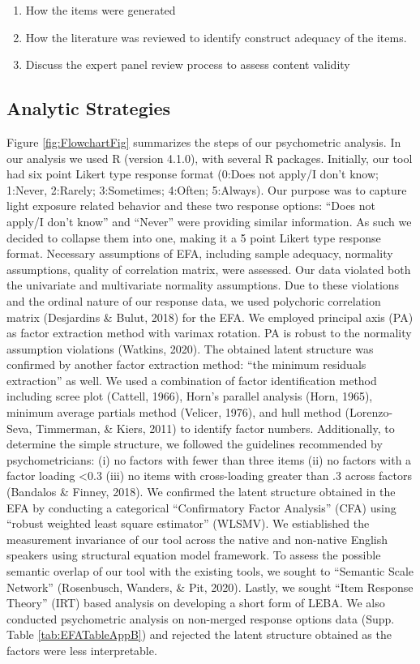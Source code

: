 \documentclass[
  english,
  man]{apa6}
\providecommand{\tightlist}{%
  \setlength{\itemsep}{0pt}\setlength{\parskip}{0pt}}
\begin{document}
\begin{enumerate}
\def\labelenumi{\arabic{enumi}.}
\tightlist
\item
  How the items were generated
\item
  How the literature was reviewed to identify construct adequacy of the items.
\item
  Discuss the expert panel review process to assess content validity
\end{enumerate}

\hypertarget{analytic-strategies}{%
\subsection{Analytic Strategies}\label{analytic-strategies}}

Figure \ref{fig:FlowchartFig} summarizes the steps of our psychometric analysis. In our analysis we used R (version 4.1.0), with several R packages. Initially, our tool had six point Likert type response format (0:Does not apply/I don't know; 1:Never, 2:Rarely; 3:Sometimes; 4:Often; 5:Always). Our purpose was to capture light exposure related behavior and these two response options: ``Does not apply/I don't know'' and ``Never'' were providing similar information. As such we decided to collapse them into one, making it a 5 point Likert type response format. Necessary assumptions of EFA, including sample adequacy, normality assumptions, quality of correlation matrix, were assessed. Our data violated both the univariate and multivariate normality assumptions. Due to these violations and the ordinal nature of our response data, we used polychoric correlation matrix (Desjardins \& Bulut, 2018) for the EFA. We employed principal axis (PA) as factor extraction method with varimax rotation. PA is robust to the normality assumption violations (Watkins, 2020). The obtained latent structure was confirmed by another factor extraction method: ``the minimum residuals extraction'' as well. We used a combination of factor identification method including scree plot (Cattell, 1966), Horn's parallel analysis (Horn, 1965), minimum average partials method (Velicer, 1976), and hull method (Lorenzo-Seva, Timmerman, \& Kiers, 2011) to identify factor numbers. Additionally, to determine the simple structure, we followed the guidelines recommended by psychometricians: (i) no factors with fewer than three items (ii) no factors with a factor loading \textless0.3 (iii) no items with cross-loading greater than .3 across factors (Bandalos \& Finney, 2018). We confirmed the latent structure obtained in the EFA by conducting a categorical ``Confirmatory Factor Analysis'' (CFA) using ``robust weighted least square estimator'' (WLSMV). We estiablished the measurement invariance of our tool across the native and non-native English speakers using structural equation model framework. To assess the possible semantic overlap of our tool with the existing tools, we sought to ``Semantic Scale Network'' (Rosenbusch, Wanders, \& Pit, 2020). Lastly, we sought ``Item Response Theory'' (IRT) based analysis on developing a short form of LEBA.
We also conducted psychometric analysis on non-merged response options data (Supp. Table \ref{tab:EFATableAppB}) and rejected the latent structure obtained as the factors were less interpretable.
\end{document}
